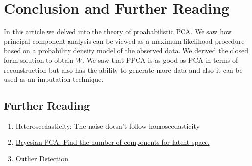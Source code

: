 \documentclass[10pt,onecolumn,letterpaper]{article}
\begin{document}
\section{Conclusion and Further Reading}
In this article we delved into the theory of proababilistic PCA. We saw how principal component analysis can be viewed as a maximum-likelihood procedure based on a probability density model of the observed data. We derived the closed form solution to obtain $W$. We saw that PPCA is as good as PCA in terms of reconstruction but also has the ability to generate more data and also it can be used as an imputation technique.


\subsection{Further Reading}

\begin{enumerate}
\item \href{https://www.microsoft.com/en-us/research/uploads/prod/2006/01/Bishop-Pattern-Recognition-and-Machine-Learning-2006.pdf, page: 583-586}{Heteroscedasticity: The noise doesn't follow homoscedasticity}
\item \href{https://proceedings.neurips.cc/paper_files/paper/1998/file/c88d8d0a6097754525e02c2246d8d27f-Paper.pdf}{Bayesian PCA: Find the number of components for latent space.}
\item \href{https://www.sciencedirect.com/science/article/pii/S0167947309001248}{Outlier Detection}
\end{enumerate}

% 
% 
\end{document}
